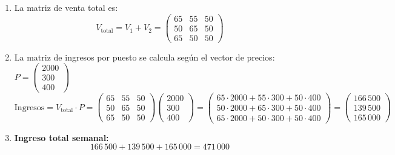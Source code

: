\begin{prob}
\begin{myproof}
\begin{enumerate}[$(a)$]
\item La matriz de venta total es:
\[
V_{\text{total}} = V_1 + V_2 = \boxed{\begin{pmatrix}
65 & 55 & 50 \\
50 & 65 & 50 \\
65 & 50 & 50
\end{pmatrix}}
\]

\item La matriz de ingresos por puesto se calcula según el vector de precios: $P = \begin{pmatrix} 2000 \\ 300 \\ 400 \end{pmatrix}$
\[
\text{Ingresos} = V_{\text{total}} \cdot P = \begin{pmatrix}
65 & 55 & 50 \\
50 & 65 & 50 \\
65 & 50 & 50
\end{pmatrix} \begin{pmatrix} 2000 \\ 300 \\ 400 \end{pmatrix} = \begin{pmatrix}
65\cdot2000 + 55\cdot300 + 50\cdot400 \\
50\cdot2000 + 65\cdot300 + 50\cdot400 \\
65\cdot2000 + 50\cdot300 + 50\cdot400
\end{pmatrix} = \boxed{\begin{pmatrix}
166\,500 \\
139\,500 \\
165\,000
\end{pmatrix}}
\]

\item \textbf{Ingreso total semanal:}
\[
166\,500 + 139\,500 + 165\,000 = \boxed{471\,000}
\]
\end{enumerate}
\end{myproof}
\end{prob}

